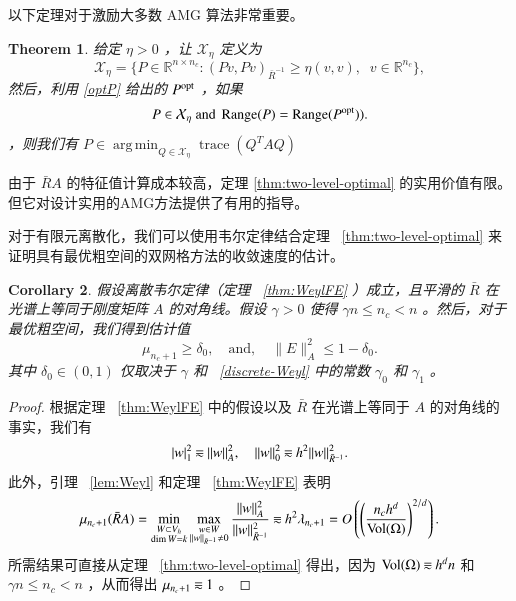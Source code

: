 \documentclass[12pt]{acta_2011xz}
\newcommand{\eqqsim}{\mathbin{\rotatebox[origin=c]{180}{\ensuremath{\cong}}}}
\newtheorem{theorem}{Theorem}[section]
\newtheorem{corollary}[theorem]{Corollary}
\DeclareMathOperator*{\argmin}{arg\,min}
\DeclareMathOperator*{\range}{Range}
\begin{document}
以下定理对于激励大多数 AMG 算法非常重要。
   \begin{theorem}   \label{t:trace-min}    给定    $\eta>0$    ，让    $\mathcal X_{\eta}$    定义为 
   \begin{equation}\label{chi}
\mathcal X_\eta=\bigg \{ 
  P\in \mathbb R^{n\times n_c}: (Pv,Pv)_{\bar R^{-1}}\ge\eta (v,v),\;\;
    v\in \mathbb R^{n_c}\bigg \} ,
\end{equation}    然后，利用    \eqref{optP}    给出的    $P^{\rm opt}$    ，如果 
   $$
    P\in \mathcal X_{\eta} \text{ and } \range(P)=\range(P^{\rm opt})).
$$    ，则我们有    $P\in \argmin_{Q\in \mathcal{X}_\eta}\operatorname{trace}(Q^TAQ)$     \end{theorem}     

由于   $\bar RA$   的特征值计算成本较高，定理   \ref{thm:two-level-optimal}   的实用价值有限。但它对设计实用的AMG方法提供了有用的指导。  

对于有限元离散化，我们可以使用韦尔定律结合定理~   \ref{thm:two-level-optimal}    来证明具有最优粗空间的双网格方法的收敛速度的估计。
   \begin{corollary}假设离散韦尔定律（定理~    \ref{thm:WeylFE}    ）成立，且平滑的    $\bar{R}$    在光谱上等同于刚度矩阵 
   $A$    的对角线。假设    $\gamma > 0 $    使得    $\gamma n\le n_c<n$    。然后，对于最优粗空间，我们得到估计值
   \[
\mu_{n_c+1}\ge \delta_0,\quad \mbox{and},\quad \|E\|_A^2\le 1-\delta_0.
\]    其中    $\delta_0\in(0,1)$    仅取决于    $\gamma$    和~    \eqref{discrete-Weyl}    中的常数    $\gamma_0$    和    $\gamma_1$   。  \end{corollary}   
   \begin{proof}根据定理~    \ref{thm:WeylFE}    中的假设以及
   $\bar{R}$    在光谱上等同于    $A$    的对角线的事实，我们有
   \begin{equation}
    |w|_1^2\eqqsim \|w\|_A^2, \quad \|w\|_0^2\eqqsim h^2\|w\|_{\bar R^{-1}}^2.
\end{equation}    此外，引理~    \ref{lem:Weyl}    和定理~    \ref{thm:WeylFE}    表明
   \begin{equation}
    \mu_{n_c+1}(\bar RA)=\min_{\substack{W\subset V_h \\  \dim{W}=k}}\max_{\substack{w\in W \\  \|w\|_{\bar R^{-1}}\ne 0}}\frac{\|w\|_A^2}{\|w\|_{\bar R^{-1}}^2}\eqqsim h^2 \lambda_{n_c+1} = O\left(\left(\frac{n_ch^d}{\operatorname{Vol}(\Omega)}\right)^{2/d}\right).
\end{equation}    所需结果可直接从定理~    \ref{thm:two-level-optimal}    得出，因为
   $\operatorname{Vol}(\Omega)\eqqsim h^dn$    和    $\gamma n\le n_c<n$    ，从而得出    $\mu_{n_c+1} \eqqsim 1$    。  \end{proof}     
\end{document}
